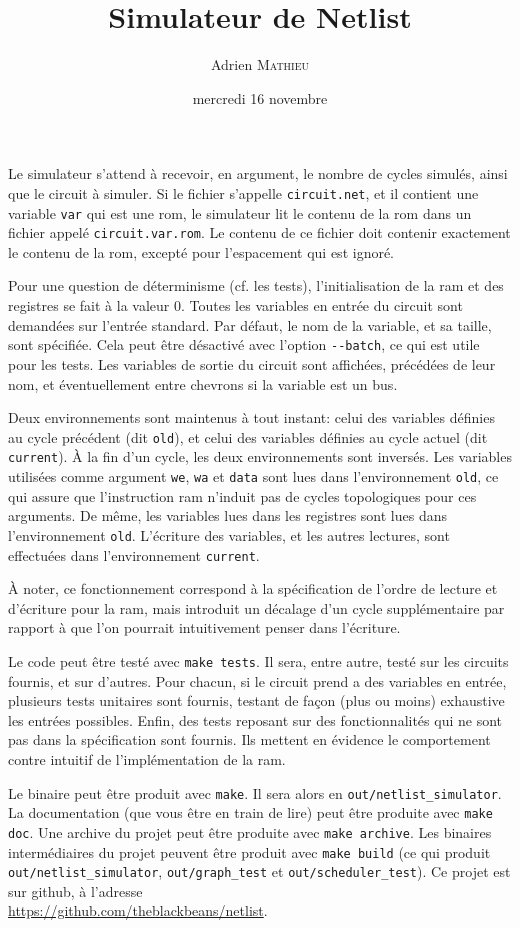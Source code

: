 \documentclass{scrartcl}
\title{Simulateur de Netlist}
\author{Adrien \textsc{Mathieu}}
\date{mercredi 16 novembre}
\begin{document}
\maketitle

Le simulateur s'attend à recevoir, en argument, le nombre de cycles simulés,
ainsi que le circuit à simuler. Si le fichier s'appelle \verb|circuit.net|, et il
contient une variable \verb|var| qui est une rom, le simulateur lit le contenu de
la rom dans un fichier appelé \verb|circuit.var.rom|. Le contenu de ce fichier
doit contenir exactement le contenu de la rom, excepté pour l'espacement qui est
ignoré.\par
Pour une question de déterminisme (cf. les tests), l'initialisation de la ram et
des registres se fait à la valeur $0$. Toutes les variables en entrée du circuit
sont demandées sur l'entrée standard. Par défaut, le nom de la variable, et sa
taille, sont spécifiée. Cela peut être désactivé avec l'option \verb|--batch|,
ce qui est utile pour les tests. Les variables de sortie du circuit sont
affichées, précédées de leur nom, et éventuellement entre chevrons si la variable
est un bus.\par
Deux environnements sont maintenus à tout instant: celui des variables définies
au cycle précédent (dit \verb|old|), et celui des variables définies au cycle
actuel (dit \verb|current|). À la fin d'un cycle, les deux environnements sont
inversés. Les variables utilisées comme argument \verb|we|, \verb|wa| et
\verb|data| sont lues dans l'environnement \verb|old|, ce qui assure que
l'instruction ram n'induit pas de cycles topologiques pour ces arguments. De
même, les variables lues dans les registres sont lues dans l'environnement
\verb|old|. L'écriture des variables, et les autres lectures, sont effectuées
dans l'environnement \verb|current|.\par
À noter, ce fonctionnement correspond à la spécification de l'ordre de lecture
et d'écriture pour la ram, mais introduit un décalage d'un cycle supplémentaire
par rapport à que l'on pourrait intuitivement penser dans l'écriture.\par
Le code peut être testé avec \verb|make tests|. Il sera, entre autre, testé sur
les circuits fournis, et sur d'autres. Pour chacun, si le circuit prend a des
variables en entrée, plusieurs tests unitaires sont fournis, testant de façon
(plus ou moins) exhaustive les entrées possibles. Enfin, des tests reposant sur
des fonctionnalités qui ne sont pas dans la spécification sont fournis. Ils
mettent en évidence le comportement contre intuitif de l'implémentation de la
ram.\par
Le binaire peut être produit avec \verb|make|. Il sera alors en
\verb|out/netlist_simulator|. La documentation (que vous être en train de lire)
peut être produite avec \verb|make doc|. Une archive du projet peut être produite
avec \verb|make archive|. Les binaires intermédiaires du projet peuvent être
produit avec \verb|make build| (ce qui produit \verb|out/netlist_simulator|,
\verb|out/graph_test| et \verb|out/scheduler_test|). Ce projet est sur github, à
l'adresse\\
\url{https://github.com/theblackbeans/netlist}.
\end{document}
